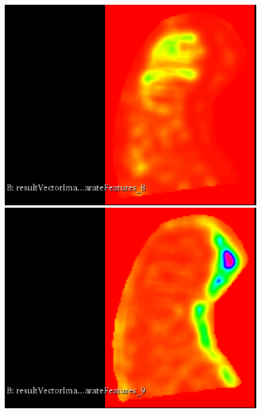 \documentclass{InsightArticle}
\begin{document}
\begin{figure}[H]
  \begin{center}
    \includegraphics[scale=0.3]{figures/LongRunLowGreyLevelEmphasis.eps}
    \includegraphics[scale=0.3]{figures/LongRunHighGreyLevelEmphasis.eps}

\end{center}
\end{figure}
\end{document}
